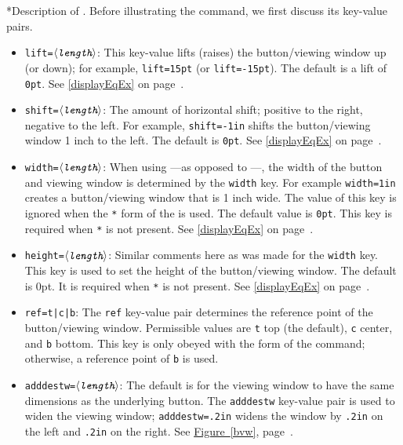 \documentclass{article}
\makeatletter
\def\meta#1{$\langle\textit{\texttt{#1}}\rangle$}
\renewcommand{\paragraph}
    {\@startsection{paragraph}{4}{0pt}{6pt}{-3pt}
    {\normalfont\normalsize\bfseries}}
\makeatother
\begin{document}
\paragraph*{Description of .}
Before illustrating the  command, we first discuss its
key-value pairs.
\begin{itemize}
\item \texttt{lift=\meta{length}}: This key-value lifts (raises) the
    button/viewing window up (or down); for example,
    \texttt{lift=15pt} (or \texttt{lift=-15pt}). The default is a lift
    of \texttt{0pt}. See \autoref{displayEqEx} on page~\pageref*{displayEqEx}.

\item \texttt{shift=\meta{length}}: The amount of horizontal shift;
    positive to the right, negative to the left. For example,
    \texttt{shift=-1in} shifts the button/viewing window 1 inch to the
    left. The default is \texttt{0pt}. See
    \autoref{displayEqEx} on page~\pageref*{displayEqEx}.

\item \texttt{width=\meta{length}}: When using ---as
    opposed to ---, the width of the button and viewing
    window is determined by the \texttt{width} key. For example
    \texttt{width=1in} creates a button/viewing window that is 1 inch
    wide. The value of this key is ignored when the \texttt{*} form of
    the  is used. The default value is \texttt{0pt}. This
    key is required when \texttt{*} is not present. See
    \autoref{displayEqEx} on page~\pageref*{displayEqEx}.

\item \texttt{height=\meta{length}}: Similar comments here as was made
    for the \texttt{width} key. This key is used to set the height of
    the button/viewing window. The default is 0pt. It is required when
    \texttt{*} is not present. See \autoref{displayEqEx} on
    page~\pageref*{displayEqEx}.

\item \texttt{ref=t|c|b}: The \texttt{ref} key-value pair determines
    the reference point of the button/viewing window. Permissible
    values are \texttt{t} top (the default), \texttt{c} center, and
    \texttt{b} bottom. This key is only obeyed with the 
    form of the command; otherwise, a reference point of \texttt{b} is
    used.

\item \texttt{adddestw=\meta{length}}: The default is for the viewing window to have
the same dimensions as the underlying button. The \texttt{adddestw}
key-value pair is used to widen the viewing window; \texttt{adddestw=.2in}
widens the window by \texttt{.2in} on the left and \texttt{.2in} on the
right. See \hyperref[bvw]{Figure~\ref*{bvw}}, page~\pageref*{bvw}.


\end{itemize}
\end{document}
